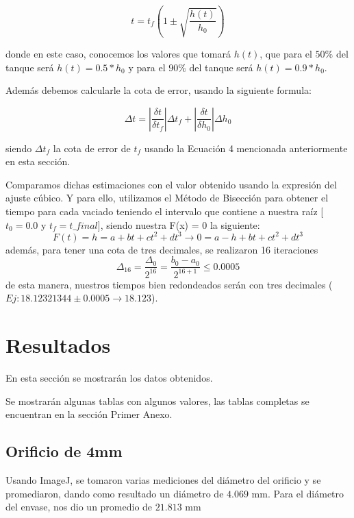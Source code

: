 \documentclass{article}
\begin{document}
\begin{equation}
    {t = t_f(1 \pm \sqrt{\frac{h(t)}{h_0}})}
    \tag{Ecuación 5}
\end{equation}

donde en este caso, conocemos los valores que tomará $h(t)$, que para el $50\%$ del tanque será $h(t) = 0.5*h_0$ y para el $90\%$ del tanque será $h(t) = 0.9*h_0$.

Además debemos calcularle la cota de error, usando la siguiente formula:

\begin{equation}
    {\Delta t = \left|\frac{\delta t}{\delta t_f}\right|\Delta t_f + \left|\frac{\delta t}{\delta h_0}\right|\Delta h_0} \tag {Ecuación 6} 
\end{equation}

siendo $\Delta t_f$ la cota de error de $t_f$ usando la Ecuación 4 mencionada anteriormente en esta sección.


Comparamos dichas estimaciones con el valor obtenido usando la expresión del ajuste cúbico. Y para ello, utilizamos el Método de Bisección para obtener el tiempo para cada vaciado teniendo el intervalo que contiene a nuestra raíz [$t_0 = 0.0$ y $t_f = t\_final$], siendo nuestra F(x) = 0 la siguiente:
\begin{equation}
    F(t) = h = a + bt + ct^2 + dt^3 \xrightarrow{} 0 = a - h + bt + ct^2 + dt^3
\end{equation}
además, para tener una cota de tres decimales, se realizaron 16 iteraciones
\begin{equation}
    \Delta_{16}=\frac{\Delta_0}{2^{16}}=\frac{b_0-a_0}{2^{16+1}} \leq 0.0005
\end{equation}
de esta manera, nuestros tiempos bien redondeados serán con tres decimales ($Ej: 18.12321344 \pm 0.0005 \xrightarrow{} 18.123 $).

\newpage
\section{Resultados}
En esta sección se mostrarán los datos obtenidos.

Se mostrarán algunas tablas con algunos valores, las tablas completas se encuentran en la sección Primer Anexo.

\subsection{Orificio de 4mm}
Usando ImageJ, se tomaron varias mediciones del diámetro del orificio y se promediaron, dando como resultado un diámetro de $4.069$ mm. Para el diámetro del envase, nos dio un promedio de $21.813$ mm
\end{document}
